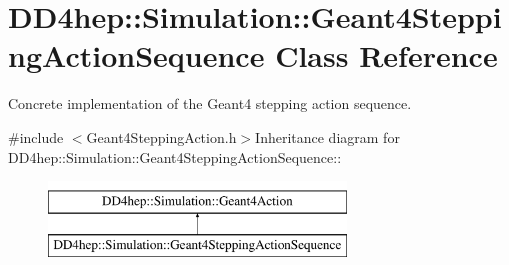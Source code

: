 \hypertarget{class_d_d4hep_1_1_simulation_1_1_geant4_stepping_action_sequence}{
\section{DD4hep::Simulation::Geant4SteppingActionSequence Class Reference}
\label{class_d_d4hep_1_1_simulation_1_1_geant4_stepping_action_sequence}
}


Concrete implementation of the Geant4 stepping action sequence.  


{\ttfamily \#include $<$Geant4SteppingAction.h$>$}Inheritance diagram for DD4hep::Simulation::Geant4SteppingActionSequence::\begin{figure}[H]
\begin{center}
\leavevmode
\includegraphics[height=2cm]{class_d_d4hep_1_1_simulation_1_1_geant4_stepping_action_sequence}
\end{center}
\end{figure}
